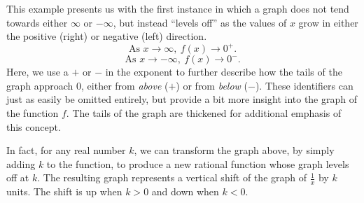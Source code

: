 \documentclass[12pt]{article}
\theoremstyle{definition}
\begin{document}
\begin{multicols}{2}
\columnbreak

This example presents us with the first instance in which a graph does not tend towards either $\infty$ or $-\infty$, but instead ``levels off'' as the values of $x$ grow in either the positive (right) or negative (left) direction.
$$\text{As } x\rightarrow\infty,\ f(x)\rightarrow 0^+.$$
$$\text{As } x\rightarrow-\infty,\ f(x)\rightarrow 0^-.$$
Here, we use a $+$ or $-$ in the exponent to further describe how the tails of the graph approach $0$, either from \textit{above} ($+$) or from \textit{below} ($-$).  These identifiers can just as easily be omitted entirely, but provide a bit more insight into the graph of the function $f$.  The tails of the graph are thickened for additional emphasis of this concept.
\end{multicols}
In fact, for any real number $k$, we can transform the graph above, by simply adding $k$ to the function, to produce a new rational function whose graph levels off at $k$.  The resulting graph represents a vertical shift of the graph of $\frac{1}{x}$ by $k$ units.  The shift is up when $k>0$ and down when $k<0$.\\
\end{document}
